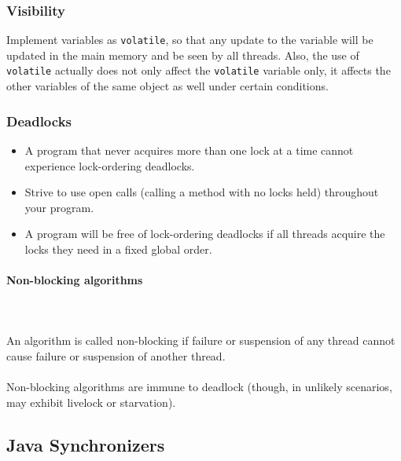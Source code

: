\documentclass[a4paper]{article}
\begin{document}
\subsubsection{Visibility}
Implement variables as \texttt{volatile}, so that any update to the variable will be updated in the main memory and be seen by all threads. Also, the use of \texttt{volatile} actually does not only affect the \texttt{volatile} variable only, it affects the other variables of the same object as well under certain conditions.
\subsubsection{Deadlocks}
\begin{itemize}
	\item A program that never acquires more than one lock at a time cannot experience lock-ordering deadlocks.
	\item Strive to use open calls (calling a method with no locks held) throughout your program.
	\item A program will be free of lock-ordering deadlocks if all threads acquire the locks they need in a fixed global order.
\end{itemize}
\paragraph{Non-blocking algorithms}\mbox{}\\
\\ \noindent An algorithm is called non-blocking if failure or suspension of any thread cannot cause failure or suspension of another thread.\\
\\
\noindent Non-blocking algorithms are immune to deadlock (though, in unlikely scenarios, may exhibit livelock or starvation).
\subsection{Java Synchronizers}
\end{document}
